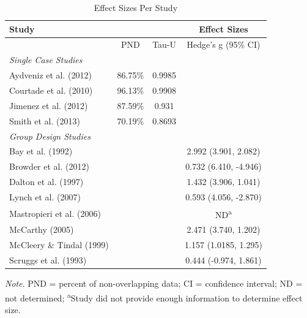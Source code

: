 \documentclass[11.5pt]{sig-alternate} %
\begin{document}
\begin{large}
\begin{table}[htp]
\caption{Effect Sizes Per Study}
\begin{tabular}{lccc}
\hline
Study & & & Effect Sizes \\ \hline
& PND & Tau-U & Hedge’s g (95\% CI) \\ \hline
\textit{Single Case Studies} & & & \\ \hline
Aydveniz et al. (2012) & 86.75\% & 0.9985 & \\ \hline
Courtade et al. (2010) & 96.13\% & 0.9908 & \\ \hline
Jimenez et al. (2012) & 87.59\% & 0.931 & \\ \hline
Smith et al. (2013) & 70.19\% & 0.8693 & \\ \hline
\textit{Group Design Studies} & & & \\ \hline
Bay et al. (1992) & & & 2.992 (3.901, 2.082) \\ \hline
Browder et al. (2012) & & & 0.732 (6.410, -4.946) \\ \hline
Dalton et al. (1997) & & & 1.432 (3.906, 1.041) \\ \hline
Lynch et al. (2007) & & & 0.593 (4.056, -2.870) \\ \hline
Mastropieri et al. (2006) & & & ND\textsuperscript{a}\\ \hline
McCarthy (2005) & & & 2.471 (3.740, 1.202) \\ \hline
McCleery \& Tindal (1999) & & & 1.157 (1.0185, 1.295) \\ \hline
Scruggs et al. (1993) & & & 0.444 (-0.974, 1.861) \\ \hline
\end{tabular}
\textit{Note}.  PND = percent of non-overlapping data; CI = confidence interval; ND = not determined; \textsuperscript{a}Study did not provide enough information to determine effect size.
\end{table}




\end{large}
\end{document}
